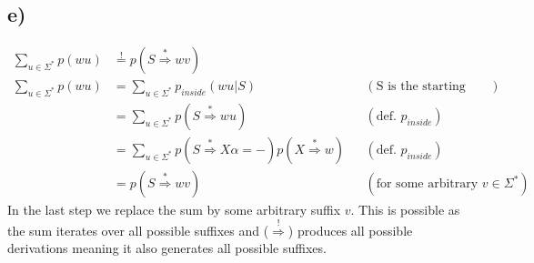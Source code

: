 \documentclass[a4paper,12pt]{ETHexercise}
\begin{document}
\subsection*{e)}
\begin{align}
    \sum_{u \in \Sigma^*}p(wu) &\stackrel{!}{=} p(S \stackrel{*}{\Rightarrow} wv)\\
    \sum_{u \in \Sigma^*}p(wu) &= \sum_{u \in \Sigma^*} p_{inside}(wu|S) &&(\text{S is the starting symbol})\\
    &= \sum_{u \in \Sigma^*} p(S \stackrel{*}{\Rightarrow} wu) &&(\text{def. }p_{inside})\\
    &= \sum_{u \in \Sigma^*} p(S \stackrel{*}{\Rightarrow} X\alpha=-) p(X \stackrel{*}{\Rightarrow} w) &&(\text{def. }p_{inside})\\
    &= p(S \stackrel{*}{\Rightarrow} wv) &&(\text{for some arbitrary }v \in \Sigma^*)
\end{align}
In the last step we replace the sum by some arbitrary suffix $v$. This is possible as the sum iterates over all possible suffixes and ($\stackrel{!}{\Rightarrow}$) produces all possible derivations meaning it also generates all possible suffixes.
\end{document}
